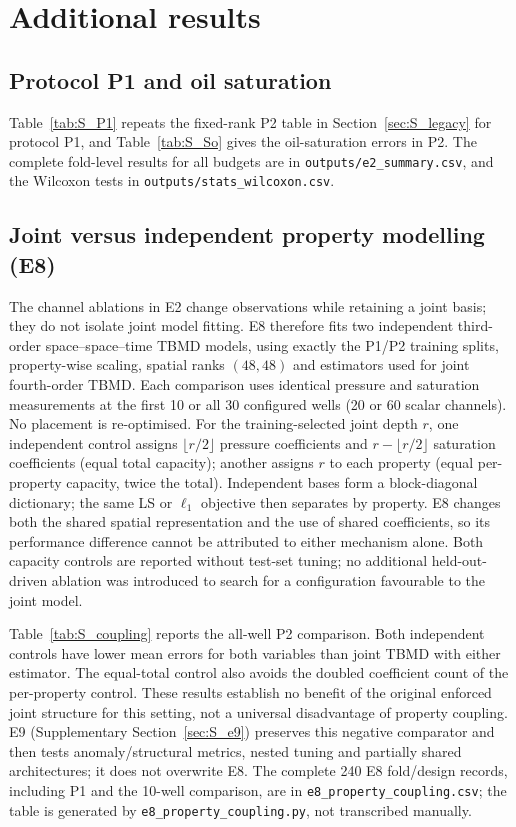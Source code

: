\section{Additional results}
\label{sec:S_results}

\subsection{Protocol P1 and oil saturation}
Table~\ref{tab:S_P1} repeats the fixed-rank P2 table in Section~\ref{sec:S_legacy} for protocol P1, and Table~\ref{tab:S_So} gives the oil-saturation errors in P2. The complete fold-level results for all budgets are in \texttt{outputs/e2\_summary.csv}, and the Wilcoxon tests in \texttt{outputs/stats\_wilcoxon.csv}.




\subsection{Joint versus independent property modelling (E8)}
The channel ablations in E2 change observations while retaining a joint basis; they do not isolate joint model fitting. E8 therefore fits two independent third-order space--space--time TBMD models, using exactly the P1/P2 training splits, property-wise scaling, spatial ranks $(48,48)$ and estimators used for joint fourth-order TBMD. Each comparison uses identical pressure and saturation measurements at the first 10 or all 30 configured wells (20 or 60 scalar channels). No placement is re-optimised. For the training-selected joint depth $r$, one independent control assigns $\lfloor r/2\rfloor$ pressure coefficients and $r-\lfloor r/2\rfloor$ saturation coefficients (equal total capacity); another assigns $r$ to each property (equal per-property capacity, twice the total). Independent bases form a block-diagonal dictionary; the same LS or $\ell_1$ objective then separates by property. E8 changes both the shared spatial representation and the use of shared coefficients, so its performance difference cannot be attributed to either mechanism alone. Both capacity controls are reported without test-set tuning; no additional held-out-driven ablation was introduced to search for a configuration favourable to the joint model.

Table~\ref{tab:S_coupling} reports the all-well P2 comparison. Both independent controls have lower mean errors for both variables than joint TBMD with either estimator. The equal-total control also avoids the doubled coefficient count of the per-property control. These results establish no benefit of the original enforced joint structure for this setting, not a universal disadvantage of property coupling. E9 (Supplementary Section~\ref{sec:S_e9}) preserves this negative comparator and then tests anomaly/structural metrics, nested tuning and partially shared architectures; it does not overwrite E8. The complete 240 E8 fold/design records, including P1 and the 10-well comparison, are in \texttt{e8\_property\_coupling.csv}; the table is generated by \texttt{e8\_property\_coupling.py}, not transcribed manually.

